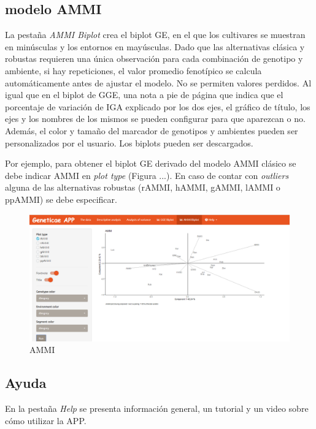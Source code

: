 \subsection{modelo AMMI}

La pestaña \emph{AMMI Biplot} crea el biplot GE, en el que los cultivares se muestran en minúsculas y los entornos en mayúsculas. Dado que las alternativas clásica y robustas requieren una única observación para cada combinación de genotipo y ambiente, si hay repeticiones, el valor promedio fenotípico se calcula automáticamente antes de ajustar el modelo. No se permiten valores perdidos. Al igual que en el biplot de GGE, una nota a pie de página que indica que el porcentaje de variación de IGA explicado por los dos ejes, el gráfico de título, los ejes y los nombres de los mismos se pueden configurar para que aparezcan o no. Además, el color y tamaño del marcador de genotipos y ambientes pueden ser personalizados por el usuario. Los biplots pueden ser descargados.

Por ejemplo, para obtener el biplot GE derivado del modelo AMMI clásico se debe indicar
AMMI en \emph{plot type} (Figura ...). En caso de contar con \emph{outliers} alguna de las alternativas robustas (rAMMI, hAMMI, gAMMI, lAMMI o ppAMMI) se debe especificar.
 

\begin{figure}[H]
	\begin{center}
		\includegraphics[width=16cm]{./Graficos/AMMI_S.png}
	\end{center}
	\caption{AMMI}
	\label{fig:fig4313}
\end{figure}


\subsection{Ayuda}

En la pestaña \emph{Help} se presenta información general, un tutorial y un video sobre  cómo utilizar la APP.

